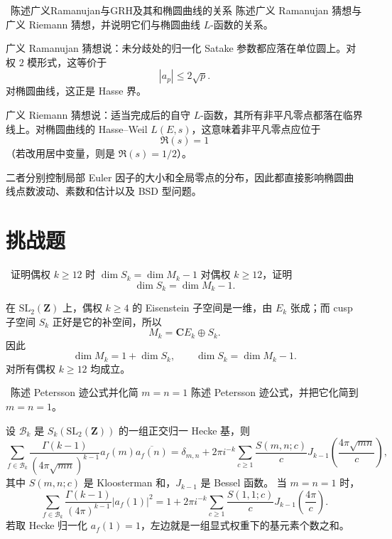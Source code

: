 \begin{problem}{\medium\ 陈述广义Ramanujan与GRH及其和椭圆曲线的关系}
陈述广义 Ramanujan 猜想与广义 Riemann 猜想，并说明它们与椭圆曲线 $L$-函数的关系。
\end{problem}
\begin{solution}
广义 Ramanujan 猜想说：未分歧处的归一化 Satake 参数都应落在单位圆上。对权 $2$ 模形式，这等价于
\[
|a_p|\le 2\sqrt p.
\]
对椭圆曲线，这正是 Hasse 界。

广义 Riemann 猜想说：适当完成后的自守 $L$-函数，其所有非平凡零点都落在临界线上。对椭圆曲线的 Hasse--Weil $L(E,s)$，这意味着非平凡零点应位于
\[
\Re(s)=1
\]
（若改用居中变量，则是 $\Re(s)=1/2$）。

二者分别控制局部 Euler 因子的大小和全局零点的分布，因此都直接影响椭圆曲线点数波动、素数和估计以及 BSD 型问题。
\end{solution}

\section{挑战题 \hard}

\begin{problem}{\hard\ 证明偶权 $k\ge12$ 时 $\dim S_k=\dim M_k-1$}
对偶权 $k\ge12$，证明
\[
\dim S_k=\dim M_k-1.
\]
\end{problem}
\begin{solution}
在 $\mathrm{SL}_2(\mathbf Z)$ 上，偶权 $k\ge4$ 的 Eisenstein 子空间是一维，由 $E_k$ 张成；而 cusp 子空间 $S_k$ 正好是它的补空间，所以
\[
M_k=\mathbf C E_k\oplus S_k.
\]
因此
\[
\dim M_k=1+\dim S_k,
\qquad
\dim S_k=\dim M_k-1.
\]
对所有偶权 $k\ge12$ 均成立。
\end{solution}

\begin{problem}{\hard\ 陈述 Petersson 迹公式并化简 $m=n=1$}
陈述 Petersson 迹公式，并把它化简到 $m=n=1$。
\end{problem}
\begin{solution}
设 $\mathcal B_k$ 是 $S_k(\mathrm{SL}_2(\mathbf Z))$ 的一组正交归一 Hecke 基，则
\[
\sum_{f\in\mathcal B_k}
\frac{\Gamma(k-1)}{(4\pi\sqrt{mn})^{k-1}}
a_f(m)\overline{a_f(n)}
=
\delta_{m,n}
+
2\pi i^{-k}\sum_{c\ge1}\frac{S(m,n;c)}{c}
J_{k-1}\!\left(\frac{4\pi\sqrt{mn}}{c}\right),
\]
其中 $S(m,n;c)$ 是 Kloosterman 和，$J_{k-1}$ 是 Bessel 函数。
当 $m=n=1$ 时，
\[
\sum_{f\in\mathcal B_k}
\frac{\Gamma(k-1)}{(4\pi)^{k-1}}|a_f(1)|^2
=
1+
2\pi i^{-k}\sum_{c\ge1}\frac{S(1,1;c)}{c}
J_{k-1}\!\left(\frac{4\pi}{c}\right).
\]
若取 Hecke 归一化 $a_f(1)=1$，左边就是一组显式权重下的基元素个数之和。
\end{solution}

